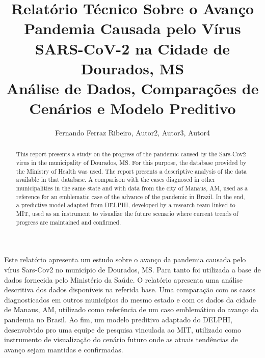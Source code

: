 \documentclass[12pt]{article}
\begin{document}
 


\title{Relatório Técnico Sobre o Avanço Pandemia Causada pelo Vírus SARS-CoV-2 na Cidade de Dourados, MS\\ Análise de Dados, Comparações de Cenários e Modelo Preditivo}

\author{Fernando Ferraz Ribeiro, Autor2, Autor3, Autor4 }
  


\address{Universidade Federal da Bahia -- Faculdade de Arquitetura -- LCAD
  (UFBA)\\
  Salvador, BA -- Brasil
\nextinstitute
  Department of Computer Science -- University of Durham\\
  Durham, U.K.
\nextinstitute
  Departamento de Sistemas e Computação\\
  Universidade Regional de Blumenal (FURB) -- Blumenau, SC -- Brazil
}


\maketitle

\begin{abstract}
  This report presents a study on the progress of the pandemic caused by the Sars-Cov2 virus in the municipality of Dourados, MS. For this purpose, the database provided by the Ministry of Health was used. The report presents a descriptive analysis of the data available in that database. A comparison with the cases diagnosed in other municipalities in the same state and with data from the city of Manaus, AM, used as a reference for an emblematic case of the advance of the pandemic in Brazil. In the end, a predictive model adapted from DELPHI, developed by a research team linked to MIT, used as an instrument to visualize the future scenario where current trends of progress are maintained and confirmed.
\end{abstract}
     
\begin{resumo} 
  Este relatório apresenta um estudo sobre o avanço da pandemia causada pelo vírus Sars-Cov2 no município de Dourados, MS. Para tanto foi utilizada a base de dados fornecida pelo Ministério da Saúde. O relatório apresenta uma análise descritiva dos dados disponíveis na referida base. Uma comparação com os casos diagnosticados em outros municípios do mesmo estado e com os dados da cidade de Manaus, AM, utilizado como referência de um caso emblemático do avanço da pandemia no Brasil. Ao fim, um modelo preditivo adaptado do DELPHI, desenvolvido pro uma equipe de pesquisa vinculada ao MIT, utilizado como instrumento de visualização do cenário futuro onde as atuais tendências de avanço sejam mantidas e confirmadas.
\end{resumo}
\end{document}
